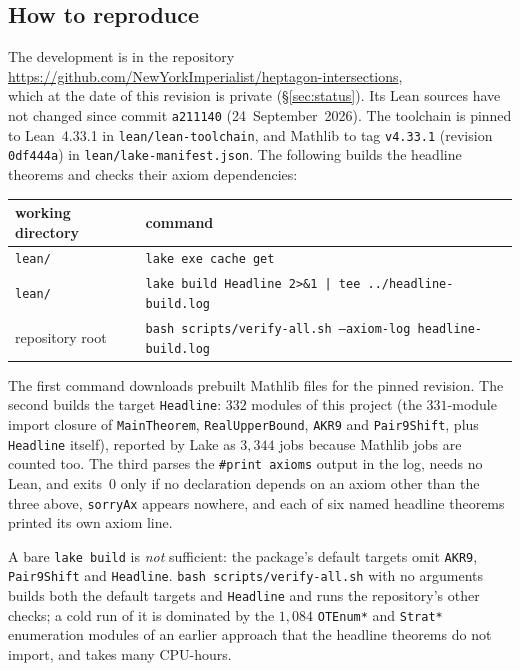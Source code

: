 \documentclass[11pt,a4paper]{article}
\theoremstyle{plain}
\theoremstyle{definition}
\theoremstyle{remark}
\begin{document}
\subsection{How to reproduce}\label{sec:reproduce}

\begin{sloppypar}
The development is in the repository\\
\url{https://github.com/NewYorkImperialist/heptagon-intersections},\\
which at the date of this revision is private (\S\ref{sec:status}). Its Lean sources
have not changed since commit \texttt{a211140} (24~September~2026). The
toolchain is pinned to Lean~4.33.1 in \texttt{lean/lean-toolchain}, and Mathlib
to tag \texttt{v4.33.1} (revision \texttt{0df444a}) in
\texttt{lean/lake-manifest.json}. The following builds the headline theorems
and checks their axiom dependencies:
\end{sloppypar}

\begin{center}\small
\begin{tabular}{@{}l@{\quad}l@{}}
\toprule
\textbf{working directory} & \textbf{command} \\
\midrule
\texttt{lean/} & \texttt{lake exe cache get} \\
\texttt{lean/} & \texttt{lake build Headline 2>\&1 | tee ../headline-build.log} \\
repository root & \texttt{bash scripts/verify-all.sh --axiom-log headline-build.log} \\
\bottomrule
\end{tabular}
\end{center}

\noindent
The first command downloads prebuilt Mathlib files for the pinned revision.
The second builds the target \texttt{Headline}: $332$ modules of this project
(the $331$-module import closure of \texttt{MainTheorem},
\texttt{RealUpperBound}, \texttt{AKR9} and \texttt{Pair9Shift}, plus
\texttt{Headline} itself), reported by Lake as $3{,}344$ jobs because Mathlib
jobs are counted too. The third parses the \texttt{\#print axioms} output in the
log, needs no Lean, and exits~$0$ only if no declaration depends on an axiom
other than the three above, \texttt{sorryAx} appears nowhere, and each of six
named headline theorems printed its own axiom line.

A bare \texttt{lake build} is \emph{not} sufficient: the package's default
targets omit \texttt{AKR9}, \texttt{Pair9Shift} and \texttt{Headline}.
\texttt{bash scripts/verify-all.sh} with no arguments builds both the default
targets and \texttt{Headline} and runs the repository's other checks; a cold
run of it is dominated by the $1{,}084$ \texttt{OTEnum*} and \texttt{Strat*} enumeration modules of an earlier
approach that the headline theorems do not import, and takes many CPU-hours.
\end{document}
